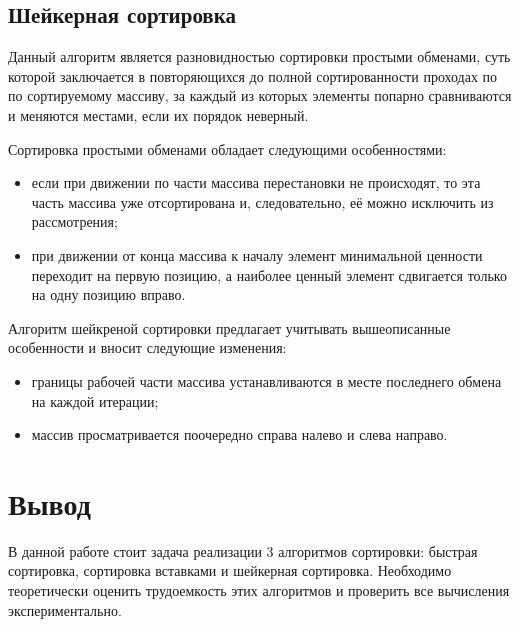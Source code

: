 \subsection{Шейкерная сортировка}
Данный алгоритм является разновидностью сортировки простыми обменами, суть которой заключается в повторяющихся до полной сортированности проходах по по сортируемому массиву, за каждый из которых элементы попарно сравниваются и меняются местами, если их порядок неверный.

Сортировка простыми обменами обладает следующими особенностями:
\begin{itemize}
    \item если при движении по части массива перестановки не происходят, то эта часть массива уже отсортирована и, следовательно, её можно исключить из рассмотрения;
    \item при движении от конца массива к началу элемент минимальной ценности переходит на первую позицию, а наиболее ценный элемент сдвигается только на одну позицию вправо.
\end{itemize}

Алгоритм шейкреной сортировки предлагает учитывать вышеописанные особенности и вносит следующие изменения:
\begin{itemize}
    \item границы рабочей части массива устанавливаются в месте последнего обмена на каждой итерации;
    \item массив просматривается поочередно справа налево и слева направо.
\end{itemize}

\section{Вывод}

В данной работе стоит задача реализации 3 алгоритмов сортировки: быстрая сортировка, сортировка вставками и шейкерная сортировка. Необходимо теоретически оценить трудоемкость этих алгоритмов и проверить все вычисления экспериментально.

